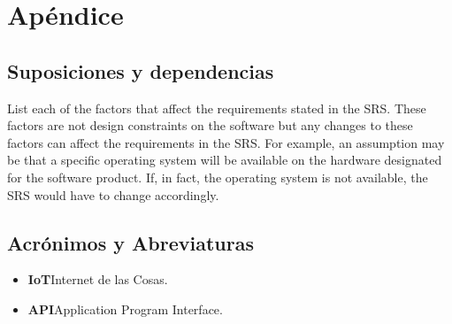 \documentclass[12pt, a4paper, twoside]{article}
\newcommand\ttab{\tab \hspace{-5cm}}
\begin{document}
\section{Apéndice}
\subsection{Suposiciones y dependencias}
List each of the factors that affect the requirements stated in the SRS. These factors are not design
constraints on the software but any changes to these factors can affect the requirements in the SRS.
For example, an assumption may be that a specific operating system will be available on the hardware
designated for the software product. If, in fact, the operating system is not available, the SRS would
have to change accordingly.
\subsection{Acrónimos y Abreviaturas}
\begin{itemize}
    \item \textbf{IoT}\ttab Internet de las Cosas.
    \item \textbf{API}\ttab Application Program Interface.
  \end{itemize}
\end{document}
